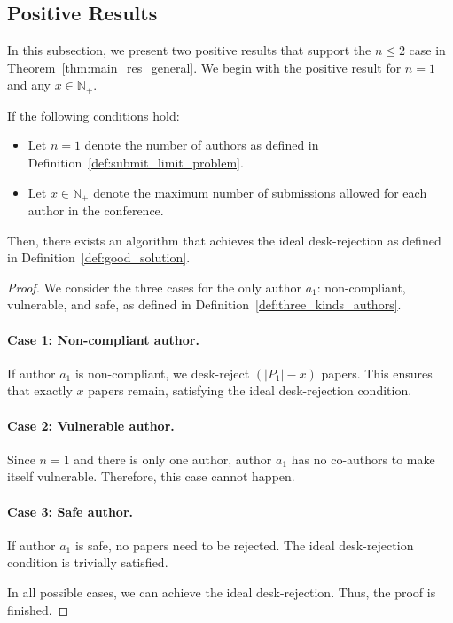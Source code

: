\subsection{Positive Results} \label{sec:positive_results}
In this subsection, we present two positive results that support the $n \leq 2$ case in Theorem~\ref{thm:main_res_general}. We begin with the positive result for $n = 1$ and any $x \in \mathbb{N}_+$.

\begin{lemma}[Positive result for $n = 1$ and any $x \in \mathbb{N}_+$, general case]\label{lem:n_eq_1_positive_general}
    If the following conditions hold:
    \begin{itemize}
        \item Let $n = 1$ denote the number of authors as defined in Definition~\ref{def:submit_limit_problem}.
        \item Let $x \in \mathbb{N}_+$ denote the maximum number of submissions allowed for each author in the conference.
    \end{itemize}
    Then, there exists an algorithm that achieves the ideal desk-rejection as defined in Definition~\ref{def:good_solution}.
\end{lemma}

\begin{proof}
We consider the three cases for the only author $a_1$: non-compliant, vulnerable, and safe, as defined in Definition~\ref{def:three_kinds_authors}.

\paragraph{Case 1: Non-compliant author.} If author $a_1$ is non-compliant, we desk-reject $(|P_1| - x)$ papers. This ensures that exactly $x$ papers remain, satisfying the ideal desk-rejection condition.

\paragraph{Case 2: Vulnerable author.} Since $n = 1$ and there is only one author, author $a_1$ has no co-authors to make itself vulnerable. Therefore, this case cannot happen.

\paragraph{Case 3: Safe author.} If author $a_1$ is safe, no papers need to be rejected. The ideal desk-rejection condition is trivially satisfied.

In all possible cases, we can achieve the ideal desk-rejection. Thus, the proof is finished. 
\end{proof}

